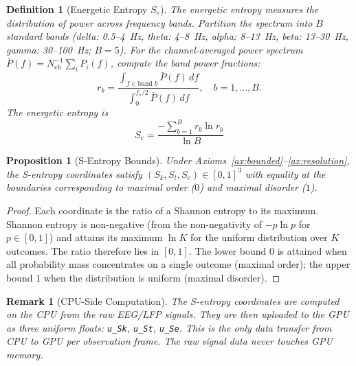 \documentclass[11pt,twocolumn,a4paper]{article}
\newtheorem{proposition}[theorem]{Proposition}
\newtheorem{definition}[theorem]{Definition}
\newtheorem{remark}[theorem]{Remark}
\newcommand{\Sk}{S_k}
\newcommand{\St}{S_t}
\newcommand{\Se}{S_e}
\begin{document}
\begin{definition}[Energetic Entropy $\Se$]
\label{def:se}
The energetic entropy measures the distribution of power across frequency bands.
Partition the spectrum into $B$ standard bands (delta: 0.5--4~Hz, theta: 4--8~Hz, alpha: 8--13~Hz, beta: 13--30~Hz, gamma: 30--100~Hz; $B = 5$).
For the channel-averaged power spectrum $\bar{P}(f) = N_{\mathrm{ch}}^{-1} \sum_i P_i(f)$, compute the band power fractions:
\begin{equation}
r_b = \frac{\int_{f \in \text{band } b} \bar{P}(f)\,df}{\int_0^{f_s/2} \bar{P}(f)\,df}, \quad b = 1, \ldots, B.
\end{equation}
The energetic entropy is
\begin{equation}
\boxed{\Se = \frac{-\sum_{b=1}^B r_b \ln r_b}{\ln B}}
\label{eq:se}
\end{equation}
\end{definition}

\begin{proposition}[S-Entropy Bounds]
\label{prop:sbounds}
Under Axioms~\ref{ax:bounded}--\ref{ax:resolution}, the S-entropy coordinates satisfy $(\Sk, \St, \Se) \in [0,1]^3$ with equality at the boundaries corresponding to maximal order ($0$) and maximal disorder ($1$).
\end{proposition}

\begin{proof}
Each coordinate is the ratio of a Shannon entropy to its maximum.
Shannon entropy is non-negative (from the non-negativity of $-p \ln p$ for $p \in [0,1]$) and attains its maximum $\ln K$ for the uniform distribution over $K$ outcomes.
The ratio therefore lies in $[0,1]$.
The lower bound $0$ is attained when all probability mass concentrates on a single outcome (maximal order); the upper bound $1$ when the distribution is uniform (maximal disorder).
\end{proof}

\begin{remark}[CPU-Side Computation]
\label{rem:cpu}
The S-entropy coordinates are computed on the CPU from the raw EEG/LFP signals.
They are then uploaded to the GPU as three uniform floats: \texttt{u\_Sk}, \texttt{u\_St}, \texttt{u\_Se}.
This is the \emph{only} data transfer from CPU to GPU per observation frame.
The raw signal data never touches GPU memory.
\end{remark}


\end{document}

